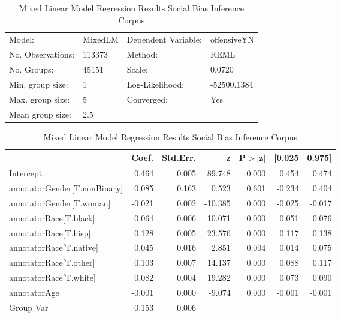 \begin{table}
\caption{Mixed Linear Model Regression Results Social Bias Inference Corpus}
\label{}
\begin{center}
\begin{tabular}{llll}
\hline
Model:            & MixedLM & Dependent Variable: & offensiveYN  \\
No. Observations: & 113373  & Method:             & REML         \\
No. Groups:       & 45151   & Scale:              & 0.0720       \\
Min. group size:  & 1       & Log-Likelihood:     & -52500.1384  \\
Max. group size:  & 5       & Converged:          & Yes          \\
Mean group size:  & 2.5     &                     &              \\
\hline
\end{tabular}
\end{center}

\begin{center}
\begin{tabular}{lrrrrrr}
\hline
                             &  Coef. & Std.Err. &       z & P$> |$z$|$ & [0.025 & 0.975]  \\
\hline
Intercept                    &  0.464 &    0.005 &  89.748 &       0.000 &  0.454 &  0.474  \\
annotatorGender[T.nonBinary] &  0.085 &    0.163 &   0.523 &       0.601 & -0.234 &  0.404  \\
annotatorGender[T.woman]     & -0.021 &    0.002 & -10.385 &       0.000 & -0.025 & -0.017  \\
annotatorRace[T.black]       &  0.064 &    0.006 &  10.071 &       0.000 &  0.051 &  0.076  \\
annotatorRace[T.hisp]        &  0.128 &    0.005 &  23.576 &       0.000 &  0.117 &  0.138  \\
annotatorRace[T.native]      &  0.045 &    0.016 &   2.851 &       0.004 &  0.014 &  0.075  \\
annotatorRace[T.other]       &  0.103 &    0.007 &  14.137 &       0.000 &  0.088 &  0.117  \\
annotatorRace[T.white]       &  0.082 &    0.004 &  19.282 &       0.000 &  0.073 &  0.090  \\
annotatorAge                 & -0.001 &    0.000 &  -9.074 &       0.000 & -0.001 & -0.001  \\
Group Var                    &  0.153 &    0.006 &         &             &        &         \\
\hline
\end{tabular}
\end{center}
\end{table}
\bigskip